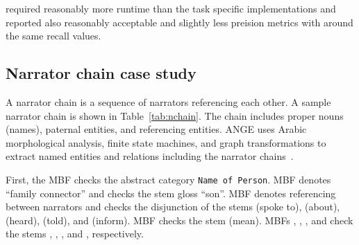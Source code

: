 \framework required reasonably more runtime than the task specific 
implementations and reported also reasonably acceptable and 
slightly less preision metrics with around
the same recall values. 

\vspace{-1em}
\subsection{Narrator chain case study}

A narrator chain is a sequence of narrators referencing each other. 
A sample narrator chain is shown in Table~\ref{tab:nchain}. 
The chain includes proper nouns (names), paternal entities, and referencing entities. 
ANGE uses Arabic morphological analysis, finite state machines, and graph transformations 
to extract named entities and relations including the narrator chains~\cite{ZaMaFlairs2012HadithBio}.

First, the MBF  checks the abstract category {\tt Name of Person}. 
MBF  denotes ``family connector'' and checks the stem gloss ``son''. 
MBF  denotes referencing between narrators and checks the disjunction of 
the stems (spoke to), (about), (heard), (told), and (inform). 
MBF  checks the stem (mean). 
MBFs , , , and  check the 
stems , , , and , respectively. 

